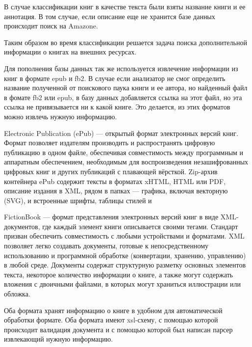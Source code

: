 \documentclass[a4paper]{report}
\begin{document}
В случае классификации книг в качестве текста были взяты название книги и ее аннотация. В том случае, если описание  еще не хранится базе данных происходит поиск на Amazone.

Таким образом во время классификации решается задача поиска дополнительной информации о книгах на внешних ресурсах.


Для пополнения базы данных так же используется извлечение информации из книг в формате epub и fb2. В случае если анализатор не смог определить название полученной от поискового паука книги и ее автора, но найденный файл в фомате fb2 или epub, в базу данных добавляется ссылка на этот файл, но эта ссылка не привязывается ни к какой книге. Это делается, \tk из этих форматов можно извлечь нужную информацию. 

Electronic Publication (ePub) — открытый формат электронных версий книг. Формат позволяет издателям производить и распространять цифровую публикацию в одном файле, обеспечивая совместимость между программным и аппаратным обеспечением, необходимым для воспроизведения незашифрованных цифровых книг и других публикаций с плавающей вёрсткой.
Zip-архив контейнера ePub содержит тексты в форматах xHTML, HTML или PDF, описание издания в XML, рядом в папках — графика, включая векторную (SVG), и встроенные шрифты, таблицы стилей и \td 

FictionBook — формат представления электронных версий книг в виде XML-документов, где каждый элемент книги описывается своими тегами. Стандарт призван обеспечить совместимость с любыми устройствами и форматами. XML позволяет легко создавать документы, готовые к непосредственному использованию и программной обработке (конвертации, хранению, управлению) в любой среде. Документы содержат структурную разметку основных элементов текста, некоторое количество информации о книге, а также могут содержать вложения с двоичными файлами, в которых могут храниться иллюстрации или обложка.

Оба формата хранят информацию о книге в удобном для автоматической обработки формате. Оба формата имеют xsl-схему, с помощью которой происходит валидация документа и с помощью которой был написан парсер извлекающий нужную информацию.

\end{document}
